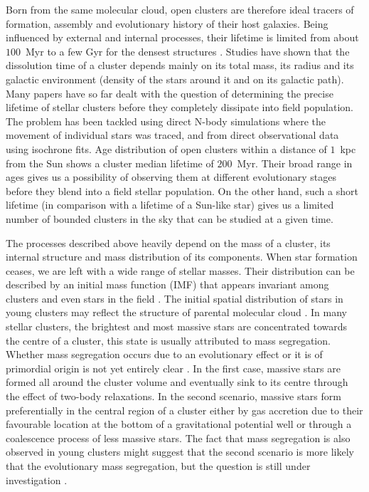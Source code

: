 Born from the same molecular cloud, open clusters are therefore ideal tracers of formation, assembly and evolutionary history of their host galaxies. Being influenced by external and internal processes, their lifetime is limited from about $100$~Myr to a few Gyr for the densest structures \cite{1998A&A...337..363P, 2013MNRAS.434.2509M}. Studies have shown that the dissolution time of a cluster depends mainly on its total mass, its radius and its galactic environment (density of the stars around it and on its galactic path). Many papers have so far dealt with the question of determining the precise lifetime of stellar clusters before they completely dissipate into field population. The problem has been tackled using direct N-body simulations \cite{1998A&A...337..363P} where the movement of individual stars was traced, and from direct observational data \cite{1971Ap&SS..13..300W, 1988IAUS..126..393W, 2019MNRAS.487.2385M, 2019A&A...623A.108B} using isochrone fits. Age distribution of open clusters within a distance of $1$~kpc from the Sun shows a cluster median lifetime of $200$~Myr. Their broad range in ages gives us a possibility of observing them at different evolutionary stages \cite{2006BASI...34..153C, 2007A&A...468..139P} before they blend \cite{2001A&A...366..827B} into a field stellar population. On the other hand, such a short lifetime (in comparison with a lifetime of a Sun-like star) gives us a limited number of bounded clusters in the sky that can be studied at a given time.

The processes described above heavily depend on the mass of a cluster, its internal structure and mass distribution of its components. When star formation ceases, we are left with a wide range of stellar masses. Their distribution can be described by an initial mass function (IMF) \cite{1955ApJ...121..161S, 1986FCPh...11....1S, 2003PASP..115..763C} that appears invariant among clusters and even stars in the field \cite{2001MNRAS.322..231K}. The initial spatial distribution of stars in young clusters may reflect the structure of parental molecular cloud \cite{2015MNRAS.448.1847H}. In many stellar clusters, the brightest and most massive stars are concentrated towards the centre of a cluster, this state is usually attributed to mass segregation. Whether mass segregation occurs due to an evolutionary effect or it is of primordial origin is not yet entirely clear \cite{1998A&A...333..897R, 1998MNRAS.295..691B, 2002MNRAS.331..245D, 2003A&A...405..525B}. In the first case, massive stars are formed all around the cluster volume and eventually sink to its centre through the effect of two-body relaxations. In the second scenario, massive stars form preferentially in the central region of a cluster either by gas accretion due to their favourable location at the bottom of a gravitational potential well or through a coalescence process of less massive stars. The fact that mass segregation is also observed in young clusters might suggest that the second scenario is more likely that the evolutionary mass segregation, but the question is still under investigation \cite{2018MNRAS.473..849D}.


